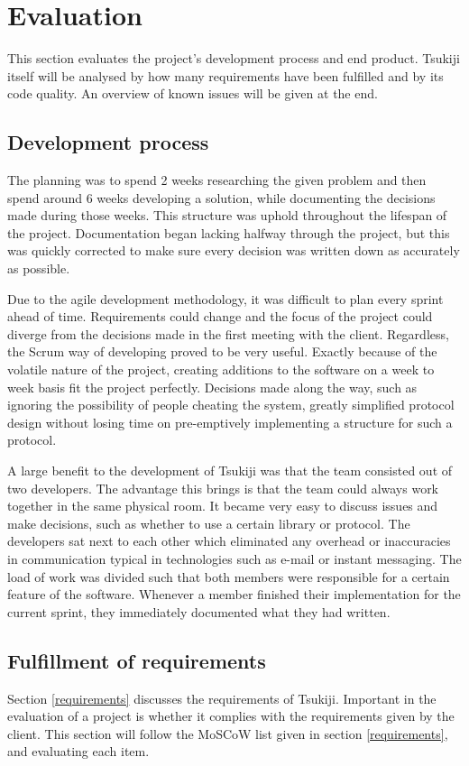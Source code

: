 \section{Evaluation}
\label{evaluation}
This section evaluates the project's development process and end product.
Tsukiji itself will be analysed by how many requirements have been fulfilled and by its code quality.
An overview of known issues will be given at the end.

\subsection{Development process}
The planning was to spend 2 weeks researching the given problem and then spend around 6 weeks developing a solution, while documenting the decisions made during those weeks.
This structure was uphold throughout the lifespan of the project.
Documentation began lacking halfway through the project, but this was quickly corrected to make sure every decision was written down as accurately as possible.

Due to the agile development methodology, it was difficult to plan every sprint ahead of time.
Requirements could change and the focus of the project could diverge from the decisions made in the first meeting with the client.
Regardless, the Scrum way of developing proved to be very useful.
Exactly because of the volatile nature of the project, creating additions to the software on a week to week basis fit the project perfectly. 
Decisions made along the way, such as ignoring the possibility of people cheating the system, greatly simplified protocol design without losing time on pre-emptively implementing a structure for such a protocol.

A large benefit to the development of Tsukiji was that the team consisted out of two developers.
The advantage this brings is that the team could always work together in the same physical room.
It became very easy to discuss issues and make decisions, such as whether to use a certain library or protocol.
The developers sat next to each other which eliminated any overhead or inaccuracies in communication typical in technologies such as e-mail or instant messaging.
The load of work was divided such that both members were responsible for a certain feature of the software.
Whenever a member finished their implementation for the current sprint, they immediately documented what they had written.

\subsection{Fulfillment of requirements}
\label{requirementsfill}
Section \ref{requirements} discusses the requirements of Tsukiji.
Important in the evaluation of a project is whether it complies with the requirements given by the client.
This section will follow the MoSCoW list given in section \ref{requirements}, and evaluating each item.

